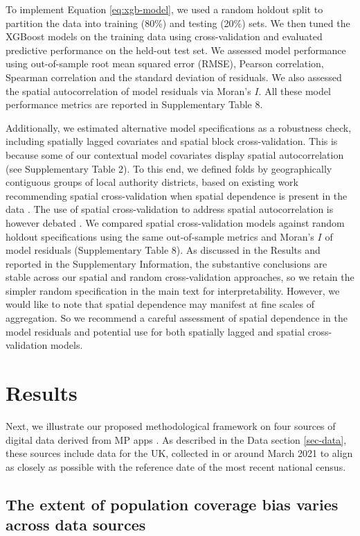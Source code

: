 \documentclass[]{rsos}%
\begin{document}
To implement Equation \ref{eq:xgb-model}, we used a random holdout split
to partition the data into training (80\%) and testing (20\%) sets. We
then tuned the XGBoost models on the training data using
cross-validation and evaluated predictive performance on the held-out
test set. We assessed model performance using out-of-sample root mean
squared error (RMSE), Pearson correlation, Spearman correlation and the
standard deviation of residuals. We also assessed the spatial
autocorrelation of model residuals via Moran's \(I\). All these model
performance metrics are reported in Supplementary Table 8.

Additionally, we estimated alternative model specifications
as a robustness check, including spatially lagged covariates and spatial
block cross-validation. This is because some of our contextual model
covariates display spatial autocorrelation (see Supplementary Table 2).
To this end, we defined folds by geographically contiguous groups of
local authority districts, based on existing work recommending spatial
cross-validation when spatial dependence is present in the data
\citep{roberts17}. The use of spatial cross-validation to address spatial
autocorrelation is however debated \citep{Wadoux21}. We compared spatial
cross-validation models against random holdout specifications using the
same out-of-sample metrics and Moran's \(I\) of model residuals
(Supplementary Table 8). As discussed in the Results and reported in the
Supplementary Information, the substantive conclusions are stable across
our spatial and random cross-validation approaches, so we
retain the simpler random specification in the main text for
interpretability. However, we would like to note that spatial dependence
may manifest at fine scales of aggregation. So we recommend a careful
assessment of spatial dependence in the model residuals and potential use
for both spatially lagged and spatial cross-validation models.

\section{Results}\label{results}

Next, we illustrate our proposed methodological framework on four
sources of digital data derived from MP apps . As described in the Data
section \ref{sec-data}, these sources include data for the UK,
collected in or around March 2021 to align as closely as possible with
the reference date of the most recent national census.

\subsection{The extent of population coverage bias varies across data sources}\label{the-extent-of-population-coverage-bias-varies-across-data-sources}
\end{document}
